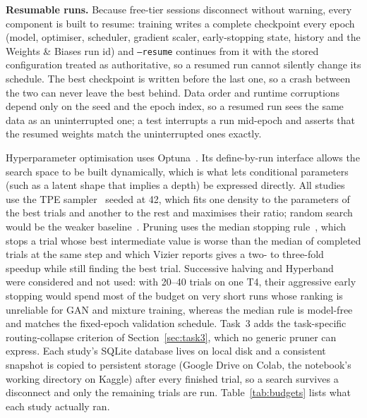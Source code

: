 \documentclass[conference]{IEEEtran}
\begin{document}
\textbf{Resumable runs.} Because free-tier sessions
disconnect without warning, every component is built to resume: training writes a
complete checkpoint every epoch (model, optimiser, scheduler, gradient scaler,
early-stopping state, history and the Weights \& Biases run id) and
\texttt{--resume} continues from it with the stored configuration treated as
authoritative, so a resumed run cannot silently change its schedule. The best
checkpoint is written before the last one, so a crash between the two can never
leave the best behind. Data order and runtime corruptions depend only on the seed
and the epoch index, so a resumed run sees the same data as an uninterrupted one;
a test interrupts a run mid-epoch and asserts that the resumed weights match the
uninterrupted ones exactly.

Hyperparameter optimisation uses Optuna~\cite{akiba2019optuna,optunadocs}. Its
define-by-run interface allows the search space to be built dynamically, which is
what lets conditional parameters (such as a latent shape that implies a depth) be
expressed directly. All studies use the TPE
sampler~\cite{bergstra2011algorithms,watanabe2023tree} seeded at 42, which fits
one density to the parameters of the best trials and another to the rest and
maximises their ratio; random search would be the weaker
baseline~\cite{bergstra2012random}. Pruning uses the median stopping
rule~\cite{golovin2017google}, which stops a trial whose best intermediate value
is worse than the median of completed trials at the same step and which Vizier
reports gives a two- to three-fold speedup while still finding the best trial.
Successive halving and Hyperband~\cite{jamieson2016non,li2018hyperband,li2020system}
were considered and not used: with 20--40 trials on one T4, their aggressive
early stopping would spend most of the budget on very short runs whose ranking is
unreliable for GAN and mixture training, whereas the median rule is model-free
and matches the fixed-epoch validation schedule. Task~3 adds the task-specific
routing-collapse criterion of Section~\ref{sec:task3}, which no generic pruner
can express. Each study's SQLite database lives on local disk and a consistent
snapshot is copied to persistent storage (Google Drive on Colab, the notebook's
working directory on Kaggle) after every finished trial, so a search survives a
disconnect and only the remaining trials are run. Table~\ref{tab:budgets} lists
what each study actually ran.
\end{document}
